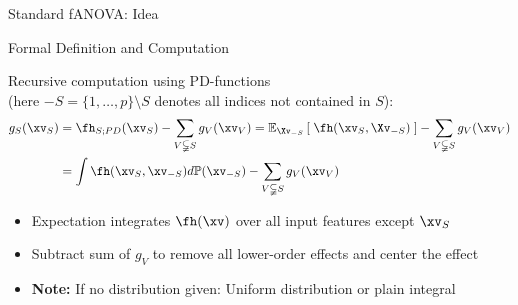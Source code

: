 \documentclass[11pt,compress,t,notes=noshow, aspectratio=169, xcolor=table]{beamer}
\begin{document}
\begin{frame}{Standard fANOVA: Idea}
    
    
\end{frame}

\begin{frame}{Formal Definition and Computation
}

\begin{definition}
    Recursive computation using PD-functions \\
    (here $-S = \{1, \ldots, p \} \setminus S$ denotes all indices not contained in \(S\)):
    \begin{align*}
    g_{S}(\xv_S)
        & = \fh_{S;PD}(\xv_S) - \sum_{V \subsetneqq S} g_V(\xv_V)
        = \mathbb{E}_{\Xv_{-S}} \left[ \; \fh(\xv_S, \Xv_{-S}) \; \right] - \sum_{V \subsetneqq S} g_V(\xv_V) \\
        & = \int \fh(\xv_S, \xv_{-S}) d \mathbb{P}(\xv_{-S}) - \sum_{V \subsetneqq S} g_V(\xv_V)
    \end{align*}
\end{definition}

\begin{itemize}
    \item Expectation integrates $\fh(\xv)$ over all input features except $\xv_S$
    \item Subtract sum of $g_V$ to remove all lower-order effects and center the effect
    \item \textbf{Note:} If no distribution given: Uniform distribution or plain integral
\end{itemize}

\end{frame}
\end{document}
